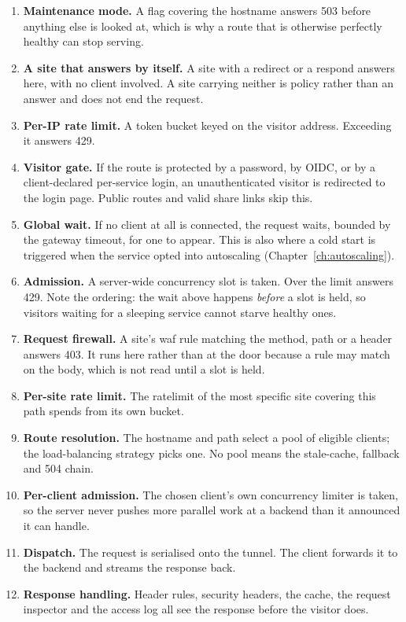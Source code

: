 \documentclass[11pt,a4paper,oneside]{book}
\newcommand{\aperiobreakableunderscore}{\textunderscore\allowbreak}
\newcommand{\aperiocodebreaks}{\XeTeXinterchartokenstate=1 }
\newcommand{\aperiocodebreaks}{}
\DeclareRobustCommand{\code}[1]{{\ttfamily\small\aperiocodebreaks
  \let\_\aperiobreakableunderscore#1}}
\begin{document}
\begin{enumerate}[leftmargin=1.5em]
  \item \textbf{Maintenance mode.} A flag covering the hostname answers
        \code{503} before anything else is looked at, which is why a
        route that is otherwise perfectly healthy can stop serving.
  \item \textbf{A site that answers by itself.} A site with a
        \code{redirect} or a \code{respond} answers here, with no client
        involved. A site carrying neither is policy rather than an answer
        and does not end the request.
  \item \textbf{Per-IP rate limit.} A token bucket keyed on the visitor
        address. Exceeding it answers \code{429}.
  \item \textbf{Visitor gate.} If the route is protected by a password,
        by OIDC, or by a client-declared per-service login, an
        unauthenticated visitor is redirected to the login page. Public
        routes and valid share links skip this.
  \item \textbf{Global wait.} If no client at all is connected, the
        request waits, bounded by the gateway timeout, for one to appear.
        This is also where a cold start is triggered when the service
        opted into autoscaling (Chapter~\ref{ch:autoscaling}).
  \item \textbf{Admission.} A server-wide concurrency slot is taken. Over
        the limit answers \code{429}. Note the ordering: the wait above
        happens \emph{before} a slot is held, so visitors waiting for a
        sleeping service cannot starve healthy ones.
  \item \textbf{Request firewall.} A site's \code{waf} rule matching the
        method, path or a header answers \code{403}. It runs here rather
        than at the door because a rule may match on the body, which is
        not read until a slot is held.
  \item \textbf{Per-site rate limit.} The \code{rate\_limit} of the most
        specific site covering this path spends from its own bucket.
  \item \textbf{Route resolution.} The hostname and path select a pool of
        eligible clients; the load-balancing strategy picks one. No pool
        means the stale-cache, fallback and \code{504} chain.
  \item \textbf{Per-client admission.} The chosen client's own
        concurrency limiter is taken, so the server never pushes more
        parallel work at a backend than it announced it can handle.
  \item \textbf{Dispatch.} The request is serialised onto the tunnel. The
        client forwards it to the backend and streams the response back.
  \item \textbf{Response handling.} Header rules, security headers, the
        cache, the request inspector and the access log all see the
        response before the visitor does.
\end{enumerate}
\end{document}
